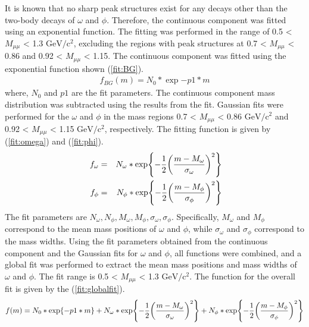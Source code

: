                 It is known that no sharp peak structures exist for any decays other than the two-body decays of \(\omega\) and \(\phi\). Therefore, the continuous component was fitted using an exponential function. The fitting was performed in the range of 0.5 < \(M_{\mu\mu}\) < 1.3 \(\mathrm{GeV/c^2}\), excluding the regions with peak structures at 0.7 < \(M_{\mu\mu}\) < 0.86 and 0.92 < \(M_{\mu\mu}\) < 1.15. The continuous component was fitted using the exponential function shown (\ref{fit:BG}).
                \begin{eqnarray}
                    \label{fit:BG}
                    f_{BG}(m)=N_0*\exp{-p1* m}
                \end{eqnarray}
                where, \(N_0\) and \(p1\) are the fit parameters. The continuous component mass distribution was subtracted using the results from the fit. Gaussian fits were performed for the \(\omega\) and \(\phi\) in the mass regions 0.7 < \(M_{\mu\mu}\) < 0.86 \(\mathrm{GeV/c^2}\) and 0.92 < \(M_{\mu\mu}\) < 1.15 \(\mathrm{GeV/c^2}\), respectively. The fitting function is given by (\ref{fit:omega}) and (\ref{fit:phi}).
                \begin{eqnarray}
                    \label{fit:omega}
                    f_{\omega} &=& N_{\omega}*\exp{-\frac{1}{2}\qty(\frac{m-M_{\omega}}{\sigma_{\omega}})^2}\\\
                    \label{fit:phi}
                    f_{\phi} &=& N_{\phi}*\exp{-\frac{1}{2}\qty(\frac{m-M_{\phi}}{\sigma_{\phi}})^2}
                \end{eqnarray}
                The fit parameters are \(N_{\omega}, N_{\phi}, M_{\omega}, M_{\phi}, \sigma_{\omega}, \sigma_{\phi}\). Specifically, \(M_{\omega}\) and \(M_{\phi}\) correspond to the mean mass positions of \(\omega\) and \(\phi\), while \(\sigma_{\omega}\) and \(\sigma_{\phi}\) correspond to the mass widths. Using the fit parameters obtained from the continuous component and the Gaussian fits for \(\omega\) and \(\phi\), all functions were combined, and a global fit was performed to extract the mean mass positions and mass widths of \(\omega\) and \(\phi\). The fit range is 0.5 < \(M_{\mu\mu}\) < 1.3 \(\mathrm{GeV/c^2}\). The function for the overall fit is given by the (\ref{fit:globalfit}).
                \begin{eqnarray}
                    \label{fit:globalfit}
                    f(m)=N_0*\exp{-p1* m}+N_{\omega}*\exp{-\frac{1}{2}\qty(\frac{m-M_{\omega}}{\sigma_{\omega}})^2}+N_{\phi}*\exp{-\frac{1}{2}\qty(\frac{m-M_{\phi}}{\sigma_{\phi}})^2}
                \end{eqnarray}
